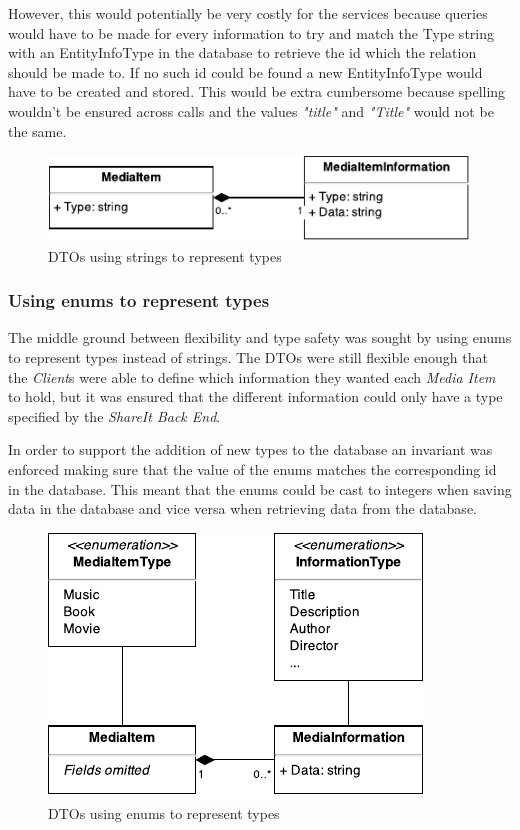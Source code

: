 \documentclass[../report.tex]{subfiles}
\begin{document}
However, this would potentially be very costly for the services because queries would have to be made for every information to try and match the Type string with an EntityInfoType in the database to retrieve the id which the relation should be made to. If no such id could be found a new EntityInfoType would have to be created and stored. This would be extra cumbersome because spelling wouldn't be ensured across calls and the values \textit{"title"} and \textit{"Title"} would not be the same.
 
\begin{figure}[!h]
\label{fig:dto_types_string}
\centering
\includegraphics[scale=0.7]{../img/typesAsString.pdf}
\caption{DTOs using strings to represent types}
\end{figure}

\subsubsection{Using enums to represent types}
The middle ground between flexibility and type safety was sought by using enums to represent types instead of strings.
The DTOs were still flexible enough that the \textit{Client}s were able to define which information they wanted each \textit{Media Item} to hold, but it was ensured that the different information could only have a type specified by the \textit{ShareIt Back End}.

In order to support the addition of new types to the database an invariant was enforced making sure that the value of the enums matches the corresponding id in the database. 
This meant that the enums could be cast to integers when saving data in the database and vice versa when retrieving data from the database. 

\begin{figure}[!h]
\label{fig:dto_types_enum}
\centering
\includegraphics[scale=0.7]{../img/typesAsEnum.pdf}
\caption{DTOs using enums to represent types}
\end{figure}
\end{document}
